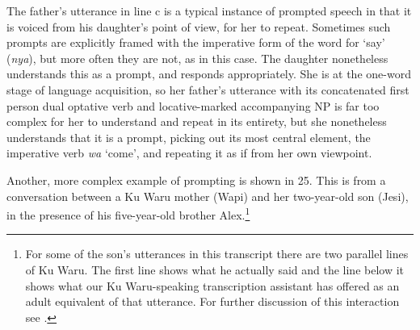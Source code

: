 \documentclass[output=paper]{langsci/langscibook}
\begin{document}
The father’s utterance in line c is a typical instance of prompted speech in that it is voiced from his daughter’s point of view, for her to repeat. Sometimes such prompts are explicitly framed with the imperative form of the word for ‘say’ (\textit{nya}), but more often they are not, as in this case. The daughter nonetheless understands this as a prompt, and responds appropriately. She is at the one-word stage of language acquisition, so her father’s utterance with its concatenated first person dual optative verb and locative-marked accompanying NP is far too complex for her to understand and repeat in its entirety, but she nonetheless understands that it is a prompt, picking out its most central element, the imperative verb \textit{wa} ‘come’, and repeating it as if from her own viewpoint.

Another, more complex example of prompting is shown in 25. This is from a conversation between a Ku Waru mother (Wapi) and her two-year-old son (Jesi), in the presence of his five-year-old brother Alex.\footnote{ For some of the son’s utterances in this transcript there are two parallel lines of Ku Waru. The first line shows what he actually said and the line below it shows what our Ku Waru-speaking transcription assistant has offered as an adult equivalent of that utterance.  For further discussion of this interaction see \cite{Rumsey2014}.}
\end{document}
